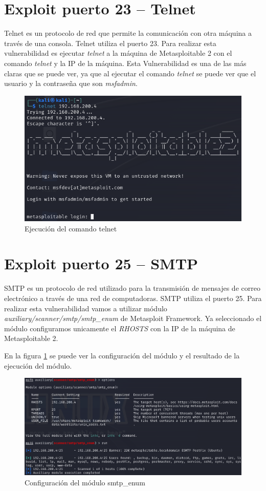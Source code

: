 \documentclass[11pt]{report}
\begin{document}
\section{Exploit puerto 23 – Telnet}
Telnet es un protocolo de red que permite la comunicación con otra máquina a través de una consola. Telnet utiliza el puerto 23. Para realizar esta vulnerabilidad
es ejecutar \emph{telnet} a la máquina de Metasploitable 2 con el comando \emph{telnet} y la IP de la máquina. Esta Vulnerabilidad 
es una de las más claras que se puede ver, ya que al ejecutar el comando \emph{telnet} se puede ver que el usuario y la contraseña que son \emph{msfadmin}.
\begin{figure}[H]
  \centering
  \includegraphics[scale=0.7]{img/telnet.png}
  \caption{Ejecución del comando telnet}
\end{figure}

\section{Exploit puerto 25 – SMTP}
SMTP es un protocolo de red utilizado para la transmisión de mensajes de correo electrónico a través de una red de computadoras. SMTP utiliza el puerto 25. Para realizar esta vulnerabilidad
vamos a utilizar módulo \emph{auxiliary/scanner/smtp/smtp\_enum} de Metasploit Framework. Ya seleccionado el módulo configuramos unicamente el \emph{RHOSTS} con la IP de la máquina de Metasploitable 2.

En la figura \ref{fig:Configuración del módulo smtp_enum} se puede ver la configuración del módulo y el resultado de la ejecución del módulo.
\begin{figure}[H]
  \centering
  \includegraphics[scale=0.6]{img/smtp.png}
  \caption{Configuración del módulo smtp\_enum}
  \label{fig:Configuración del módulo smtp_enum}
\end{figure}
\end{document}
